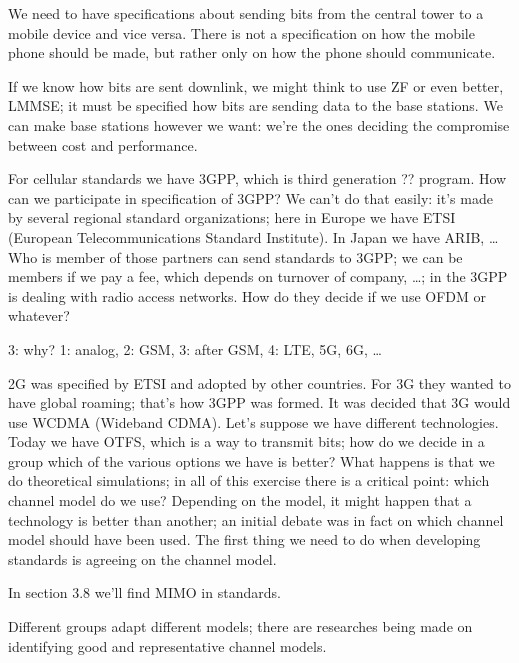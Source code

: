 \documentclass[a4paper, 12pt]{book}
\begin{document}
We need to have specifications about sending bits from the central tower to a mobile device and vice versa.
There is not a specification on how the mobile phone should be made, but rather only on how the phone should communicate.

If we know how bits are sent downlink, we might think to use ZF or even better, LMMSE; it must be specified how bits are sending data to the base stations.
We can make base stations however we want: we're the ones deciding the compromise between cost and performance.

\newpage

For cellular standards we have 3GPP, which is third generation \colorbox{yellow!40}{??} program. How can we participate in specification of 3GPP? We can't do that easily: it's made by several regional standard organizations; here in Europe we have ETSI (European Telecommunications Standard Institute). In Japan we have ARIB, \dots
Who is member of those partners can send standards to 3GPP; we can be members if we pay a fee, which depends on turnover of company, \dots; in the 3GPP is dealing with radio access networks. How do they decide if we use OFDM or whatever?

\begin{greenbar}
3: why? 1: analog, 2: GSM, 3: after GSM, 4: LTE, 5G, 6G, \dots
\end{greenbar}

2G was specified by ETSI and adopted by other countries. For 3G they wanted to have global roaming; that's how 3GPP was formed.
It was decided that 3G would use WCDMA (Wideband CDMA). Let's suppose we have different technologies.
Today we have OTFS, which is a way to transmit bits; how do we decide in a group which of the various options we have is better? What happens is that we do theoretical simulations; in all of this exercise there is a critical point: which channel model do we use? Depending on the model, it might happen that a technology is better than another; an initial debate was in fact on which channel model should have been used. The first thing we need to do when developing standards is agreeing on the channel model.

\begin{greenbar}
In section 3.8 we'll find MIMO in standards.
\end{greenbar}

Different groups adapt different models; there are researches being made on identifying good and representative channel models.
\end{document}
